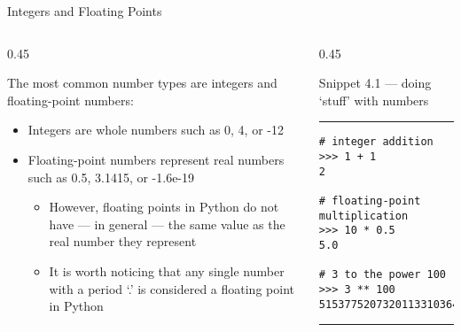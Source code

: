 \documentclass[aspectratio=1610]{beamer}
\begin{document}
\begin{frame}[fragile]{Integers and Floating Points}
	\begin{columns}[t]
		\begin{column}{0.45\textwidth}		
            
            The most common number types are integers and floating-point numbers:
            \begin{itemize}
                \item Integers are whole numbers such as 0, 4, or -12
                \item Floating-point numbers represent real numbers such as 0.5, 3.1415, or -1.6e-19
                \begin{itemize}
                    \item However, floating points in Python do not have --- in general
                    --- the same value as the real number they represent
                    \item It is worth noticing that any single number with a period `.'
                    is considered a floating point in Python 
                \end{itemize}
            \end{itemize}
	
    \end{column}
    
    \begin{column}{0.45\textwidth}
        
        Snippet 4.1 --- doing `stuff' with numbers
        \rule{\textwidth}{1pt}
        \scriptsize
        \begin{verbatim}
# integer addition
>>> 1 + 1
2

# floating-point multiplication
>>> 10 * 0.5
5.0

# 3 to the power 100
>>> 3 ** 100
515377520732011331036461129765621272702107522001

        \end{verbatim}
        \rule{\textwidth}{1pt}
		
    \end{column}
\end{columns}
\end{frame}
\end{document}
